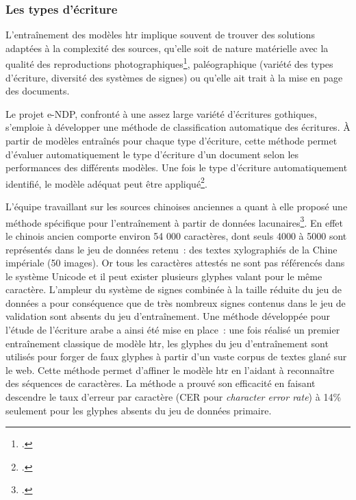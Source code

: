 \documentclass[a4paper,12pt,twoside]{book}
\begin{document}
		\subsubsection{Les types d'écriture}
		
		L'entraînement des modèles \gls{htr} implique souvent de trouver des solutions
		adaptées à la complexité des sources, qu'elle soit de nature matérielle
		avec la qualité des reproductions photographiques\footcite{leblancTranskribusEScriptoriumRetour2022}, paléographique (variété
		des types d'écriture, diversité des systèmes de signes) ou qu'elle ait
		trait à la mise en page des documents.
		
		Le projet e-NDP, confronté à une assez large variété d'écritures
		gothiques, s'emploie à développer une méthode de classification
		automatique des écritures. À partir de modèles entraînés pour chaque
		type d'écriture, cette méthode permet d'évaluer automatiquement le type
		d'écriture d'un document selon les performances des différents modèles.
		Une fois le type d'écriture automatiquement identifié, le modèle adéquat
		peut être appliqué\footcite{torresaguilarModelisationAffinageHTR2022}.
		
		L'équipe travaillant sur les sources chinoises anciennes a quant à elle
		proposé une méthode spécifique pour l'entraînement à partir de données
		lacunaires\footcite{bizais-lilligExperimentationsPourAnalyse2022}. En effet
		le chinois ancien comporte environ 54 000 caractères, dont seuls 4000 à
		5000 sont représentés dans le jeu de données retenu~: des textes
		xylographiés de la Chine impériale (50 images). Or tous les caractères
		attestés ne sont pas référencés dans le système Unicode et il peut
		exister plusieurs glyphes valant pour le même caractère. L'ampleur du
		système de signes combinée à la taille réduite du jeu de données a pour
		conséquence que de très nombreux signes contenus dans le jeu de
		validation sont absents du jeu d'entraînement. Une méthode développée
		pour l'étude de l'écriture arabe a ainsi été mise en place~: une fois
		réalisé un premier entraînement classique de modèle \gls{htr}, les glyphes du
		jeu d'entraînement sont utilisés pour forger de faux glyphes à partir
		d'un vaste corpus de textes glané sur le web. Cette méthode permet
		d'affiner le modèle \gls{htr} en l'aidant à reconnaître des séquences de
		caractères. La méthode a prouvé son efficacité en faisant descendre le
		taux d'erreur par caractère (CER pour \textit{character error rate}) à
		14\% seulement pour les glyphes absents du jeu de données primaire.
		
\end{document}
